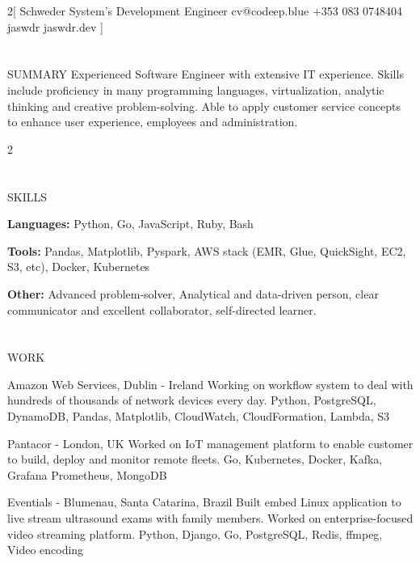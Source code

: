 \documentclass{my_cv}
\begin{document}
\begin{multicols}{2}[
        {Schweder}%
        {System's Development Engineer}%
        {cv@codeep.blue}%
        {+353 083 0748404}%
        {jaswdr}%
        {jaswdr.dev}%
]
\end{multicols}

\section{\faFileText}{SUMMARY}
Experienced Software Engineer with extensive IT experience. Skills include proficiency in many programming languages, virtualization, analytic thinking and creative problem-solving. Able to apply customer service concepts to enhance user experience, employees and administration.

\begin{multicols}{2}

\section{\faList}{SKILLS}

\textbf{Languages:} Python, Go, JavaScript, Ruby, Bash

\noindent\textbf{Tools:} Pandas, Matplotlib, Pyspark, AWS stack (EMR, Glue, QuickSight, EC2, S3, etc), Docker, Kubernetes

\noindent\textbf{Other:} Advanced problem-solver, Analytical and data-driven person, clear communicator and excellent collaborator, self-directed learner.

\section{\faPencil}{WORK}

%
    {Amazon Web Services, Dublin - Ireland}%
    {Working on workflow system to deal with hundreds of thousands of network devices every day.}
    {Python, PostgreSQL, DynamoDB, Pandas, Matplotlib, CloudWatch, CloudFormation, Lambda, S3}

%
    {Pantacor - London, UK}%
    {Worked on IoT management platform to enable customer to build, deploy and monitor remote fleets.}%
    {Go, Kubernetes, Docker, Kafka, Grafana Prometheus, MongoDB}

%
    {Eventials - Blumenau, Santa Catarina, Brazil}%
    {Built embed Linux application to live stream ultrasound exams with family members. Worked on enterprise-focused video streaming platform.}%
    {Python, Django, Go, PostgreSQL, Redis, ffmpeg, Video encoding}


\end{multicols}
\end{document}
